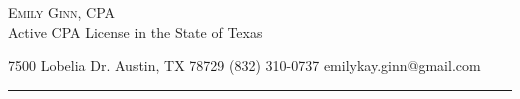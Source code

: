 \documentclass[10pt,A4]{article}
\newcommand{\cvsection}[1]
{
	\begin{center}
		\LARGE\textcolor{sectcol}{\textsc{#1}}\large
	\end{center}
}
\newcommand{\metasection}[3]
{
{#1} \hspace*{\fill} {#2} \hspace*{\fill} {#3}\\[1pt]
}
\begin{document}
\pagestyle{fancy}	








\vspace{-8pt}
\begin{center}
	\HUGE \textsc{Emily Ginn, CPA} \textcolor{sectcol}\\
	\small Active CPA License in the State of Texas
\end{center}





\footnotesize
\metasection{7500 Lobelia Dr. Austin, TX 78729}{(832) 310-0737}{emilykay.ginn@gmail.com}
\vspace{-2pt}
\textcolor{softcol}{\hrule}
\vspace{6pt}

\normalsize

\end{document}
